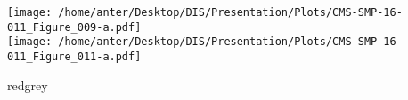 \begin{frame}
\begin{minipage}[thbp]{0.55\textwidth}
\begin{itemize}
\end{itemize}
\end{minipage}
\hspace{2mm}
\vspace{1mm}
\begin{minipage}[thbp]{0.3\textwidth}
\texttt{[image: /home/anter/Desktop/DIS/Presentation/Plots/CMS-SMP-16-011\_Figure\_009-a.pdf]}\\
\texttt{[image: /home/anter/Desktop/DIS/Presentation/Plots/CMS-SMP-16-011\_Figure\_011-a.pdf]}\\
\hspace*{18mm}\begin{beamercolorbox}[wd=23mm,ht=1mm,center,shadow=true, rounded=true]{redgrey}
{}
{\scalebox {0.61} {}}
\end{beamercolorbox}
\end{minipage}
\end{frame}

